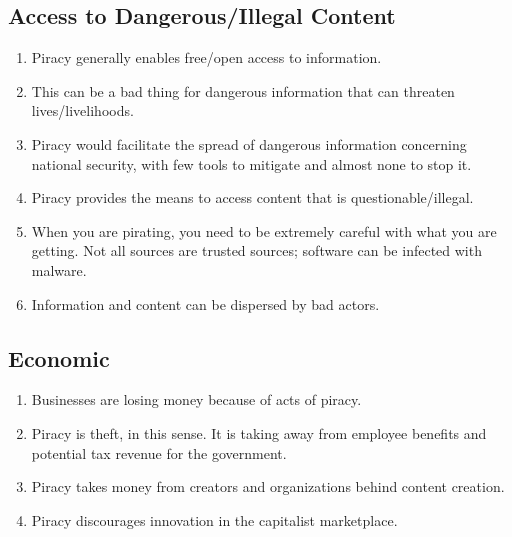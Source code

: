 \documentclass[onecolumn, 12pt]{article}
\begin{document}
\subsection{Access to Dangerous/Illegal Content}
\begin{enumerate}
  \item Piracy generally enables free/open access to information.

  \item This can be a bad thing for dangerous information that can threaten
    lives/livelihoods.

  \item Piracy would facilitate the spread of dangerous information concerning
    national security, with few tools to mitigate and almost none to stop it.

  \item Piracy provides the means to access content that is questionable/illegal.

  \item When you are pirating, you need to be extremely careful with what you
    are getting. Not all sources are trusted sources; software can be infected
    with malware.

  \item Information and content can be dispersed by bad actors.
\end{enumerate}

\subsection{Economic}
\begin{enumerate}
  \item Businesses are losing money because of acts of piracy.
  \item Piracy is theft, in this sense. It is taking away from employee
    benefits and potential tax revenue for the government.

  \item Piracy takes money from creators and organizations behind content
    creation.~\cite{congress:pirating-the-american-dream}

  \item {}

    Piracy discourages innovation in the capitalist marketplace.
\end{enumerate}
\end{document}
